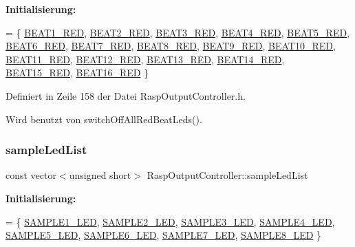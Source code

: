 {\bfseries Initialisierung\+:}
\begin{DoxyCode}
= \{
            \hyperlink{namespaceoutputs_ae1c055268c6bbfadcc272bc6028b1a59}{BEAT1\_RED}, \hyperlink{namespaceoutputs_a7b5646e7b81bc49443f10f2b852384bb}{BEAT2\_RED}, \hyperlink{namespaceoutputs_a0c48c063f394a0735f24036e932bff2b}{BEAT3\_RED}, 
      \hyperlink{namespaceoutputs_a73a38f1135a723ebb294500daa641aec}{BEAT4\_RED}, \hyperlink{namespaceoutputs_a992a202d7fce79a524fe71498efb3709}{BEAT5\_RED}, \hyperlink{namespaceoutputs_a44e21deb20acdd11aa47bd5c2358dd6c}{BEAT6\_RED}, \hyperlink{namespaceoutputs_a88730a5804ff8785e2fb07a1957a243c}{BEAT7\_RED}, 
      \hyperlink{namespaceoutputs_aeb7e7b9874ac290d2ff579a8b144fe13}{BEAT8\_RED}, \hyperlink{namespaceoutputs_a57a4d2c831b8b263bc763032afddaa03}{BEAT9\_RED},
            \hyperlink{namespaceoutputs_a3108e2ed7adaa0c15822673c1cf5341d}{BEAT10\_RED}, \hyperlink{namespaceoutputs_a3b55bd1a681764d7655dfee327930872}{BEAT11\_RED}, \hyperlink{namespaceoutputs_a3138968cd14e309f1e88228bd1259f3f}{BEAT12\_RED}, 
      \hyperlink{namespaceoutputs_a34ead0f387c2557f9d74d57186f1578f}{BEAT13\_RED}, \hyperlink{namespaceoutputs_ae72dd425b992846bc954f41227bdda1a}{BEAT14\_RED}, \hyperlink{namespaceoutputs_a6cdbcf8d70f85316af1ea2b96d9b72bd}{BEAT15\_RED}, \hyperlink{namespaceoutputs_a3dbc6b2fd920d581b752b72f86be3733}{BEAT16\_RED}
    \}
\end{DoxyCode}


Definiert in Zeile 158 der Datei Rasp\+Output\+Controller.\+h.



Wird benutzt von switch\+Off\+All\+Red\+Beat\+Leds().

\mbox{\label{class_rasp_output_controller_ad0ad19b081450eb1d9cd6548c14a23ea}} 
\subsubsection{\texorpdfstring{sample\+Led\+List}{sampleLedList}}
{\footnotesize\ttfamily const vector$<$unsigned short$>$ Rasp\+Output\+Controller\+::sample\+Led\+List\hspace{0.3cm}{\ttfamily [private]}}

{\bfseries Initialisierung\+:}
\begin{DoxyCode}
= \{
            \hyperlink{namespaceoutputs_a151156390f60151968f4092740d9d6b8}{SAMPLE1\_LED}, \hyperlink{namespaceoutputs_ae0776935fda36be3a645994d16591980}{SAMPLE2\_LED}, \hyperlink{namespaceoutputs_a8a0be2be0ae271cb8b57234a189b6689}{SAMPLE3\_LED}, 
      \hyperlink{namespaceoutputs_a6fbee7a72f91577a7e1f072d00ad8d9f}{SAMPLE4\_LED}, \hyperlink{namespaceoutputs_a87e2d51fbeb2ac9fd23fc5d937b1c7c2}{SAMPLE5\_LED}, \hyperlink{namespaceoutputs_a7bdee2eb9fc676ac7edb9582334be15a}{SAMPLE6\_LED}, 
      \hyperlink{namespaceoutputs_a3d438bc8ce91fb825bf2da7834ac639e}{SAMPLE7\_LED}, \hyperlink{namespaceoutputs_ac6e07c06d1d512716e6309db54648440}{SAMPLE8\_LED}
    \}
\end{DoxyCode}


